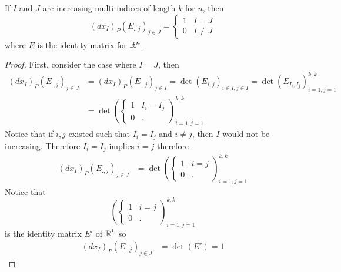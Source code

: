 \documentclass[notes]{subfiles}
\begin{document}
\begin{lemma}
    If $I$ and $J$ are increasing multi-indices of length $k$ for $n$, then
    \[
        (dx_I)_P(E_{., j})_{j \in J} = \begin{cases}
            1 & I = J \\
            0 & I \neq J
        \end{cases}
    \]
    where $E$ is the identity matrix for $\mathbb{R}^n$.
\end{lemma}
\begin{proof}
    First, consider the case where $I = J$, then
    \begin{align*}
        (dx_I)_P(E_{., j})_{j \in J}
        &= (dx_I)_P(E_{., j})_{j \in I}
        = \det(E_{i, j})_{i \in I, j \in I}
        = \det(E_{I_i, I_j})_{i = 1, j = 1}^{k, k} \\
        &= \det\left(\begin{cases}
            1 & I_i = I_j \\
            0 & .
        \end{cases}\right)_{i = 1, j = 1}^{k, k}
    \end{align*}
    Notice that if $i, j$ existed such that $I_i = I_j$ and $i \neq j$, then $I$ would not be increasing. Therefore $I_i = I_j$ implies $i = j$ therefore
    \begin{align*}
        (dx_I)_P(E_{., j})_{j \in J}
        &= \det\left(\begin{cases}
            1 & i = j \\
            0 & .
        \end{cases}\right)_{i = 1, j = 1}^{k, k}
    \end{align*}
    Notice that \[
        \left(\begin{cases}
            1 & i = j \\
            0 & .
        \end{cases}\right)_{i = 1, j = 1}^{k, k}
    \]
    is the identity matrix $E'$ of $\mathbb{R}^k$ so
    \begin{align*}
        (dx_I)_P(E_{., j})_{j \in J}
        &= \det(E')
        = 1
    \end{align*}
\end{proof}
\end{document}
